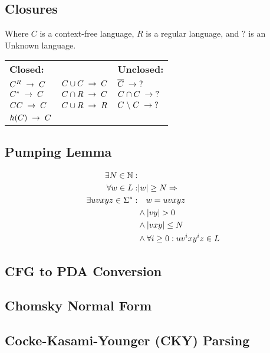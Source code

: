 \subsection{Closures}
Where $C$ is a context-free language, $R$ is a regular language, and $?$ is
an Unknown language.

\settowidth{\templength}{$C \cup C \spto C$}
\addtolength{\templength}{1cm}
\begin{tabular}{lp{\templength}l}
\textbf{Closed:} & & \textbf{Unclosed:} \\
$C^R \;\to\; C$ & $C \cup C \spto C$ & $\overline{C} \;\to\; ?$\\
$C^* \;\to\; C$ & $C \cap R \;\to\; C$ & $C \cap C \;\to\; ?$\\
$CC \;\to\; C$  & $C \cup R \;\to\; R$ & $C \;\backslash\; C \;\to\; ?$\\
$h(C) \;\to\; C$ & & \\
\end{tabular}

\subsection{Pumping Lemma}
\begin{align*}
  \exists N \in \mathbb{N}: & \\
          \forall w \in L : & |w| \geq N \Rightarrow \\
\exists uvxyz \in \Sigma^*: & \quad w = uvxyz \\
                            & \land |vy| > 0 \\
                            & \land |vxy| \leq N \\
                            & \land \forall i \geq 0: uv^ixy^iz \in L
\end{align*}

\subsection{CFG to PDA Conversion}

\subsection{Chomsky Normal Form}
\subsection{Cocke-Kasami-Younger (CKY) Parsing}

